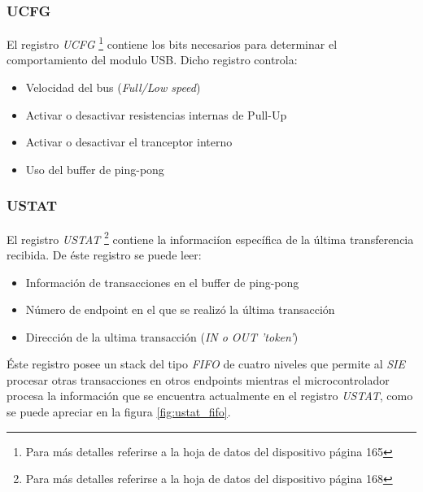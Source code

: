 \subsubsection{UCFG}
El registro \emph{UCFG} \footnote{Para m\'as detalles referirse a la hoja de
datos del dispositivo p\'agina 165} contiene los bits
necesarios para determinar el comportamiento del modulo USB. Dicho registro
controla:

\begin{itemize}
 \item Velocidad del bus (\emph{Full/Low speed})

 \item Activar o desactivar resistencias internas de Pull-Up

 \item Activar o desactivar el tranceptor interno

 \item Uso del buffer de ping-pong
\end{itemize}

\subsubsection{USTAT}
El registro \emph{USTAT} \footnote{Para m\'as detalles referirse a la hoja de
datos del dispositivo p\'agina 168} contiene la
informaci\'ion espec\'ifica de la \'ultima transferencia recibida. De \'este
registro se puede leer:

\begin{itemize}
 \item Informaci\'on de transacciones en el buffer de ping-pong

 \item N\'umero de endpoint en el que se realiz\'o la \'ultima transacci\'on

 \item Direcci\'on de la ultima transacci\'on (\emph{IN o OUT 'token'})
\end{itemize}

\'Este registro posee un stack del tipo \emph{FIFO} de cuatro niveles que
permite al \emph{SIE} procesar otras transacciones en otros endpoints mientras
el microcontrolador procesa la informaci\'on que se encuentra actualmente en
el registro \emph{USTAT}, como se puede apreciar en la figura
\ref{fig:ustat_fifo}.


